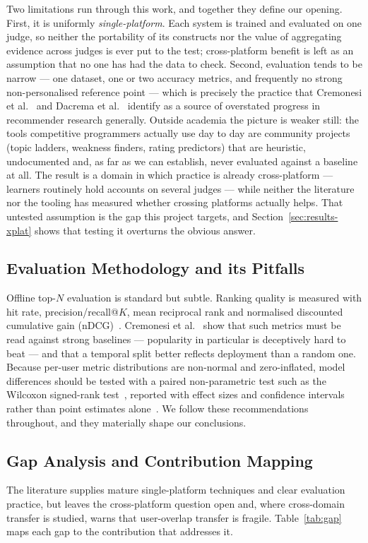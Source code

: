 \documentclass[12pt,a4paper]{article}
\newcommand{\ndcg}{nDCG}
\begin{document}
Two limitations run through this work, and together they define our opening. First, it
is uniformly \emph{single-platform}. Each system is trained and evaluated on one judge,
so neither the portability of its constructs nor the value of aggregating evidence
across judges is ever put to the test; cross-platform benefit is left as an assumption
that no one has had the data to check. Second, evaluation tends to be narrow --- one
dataset, one or two accuracy metrics, and frequently no strong non-personalised
reference point --- which is precisely the practice that Cremonesi et
al.~\cite{cremonesi2010} and Dacrema et al.~\cite{dacrema2019} identify as a source of
overstated progress in recommender research generally. Outside academia the picture is
weaker still: the tools competitive programmers actually use day to day are community
projects (topic ladders, weakness finders, rating predictors) that are heuristic,
undocumented and, as far as we can establish, never evaluated against a baseline at all.
The result is a domain in which practice is already cross-platform --- learners routinely
hold accounts on several judges --- while neither the literature nor the tooling has
measured whether crossing platforms actually helps. That untested assumption is the gap
this project targets, and Section~\ref{sec:results-xplat} shows that testing it
overturns the obvious answer.

\subsection{Evaluation Methodology and its Pitfalls}
Offline top-$N$ evaluation is standard but subtle. Ranking quality is measured with hit
rate, precision/recall@$K$, mean reciprocal rank and normalised discounted cumulative
gain (\ndcg{})~\cite{jarvelin2002}. Cremonesi et al.~\cite{cremonesi2010} show that such
metrics must be read against strong baselines --- popularity in particular is
deceptively hard to beat --- and that a temporal split better reflects deployment than a
random one. Because per-user metric distributions are non-normal and zero-inflated,
model differences should be tested with a paired non-parametric test such as the
Wilcoxon signed-rank test~\cite{wilcoxon1945}, reported with effect sizes and confidence
intervals rather than point estimates alone~\cite{dacrema2019}. We follow these
recommendations throughout, and they materially shape our conclusions.

\subsection{Gap Analysis and Contribution Mapping}
The literature supplies mature single-platform techniques and clear evaluation practice,
but leaves the cross-platform question open and, where cross-domain transfer is studied,
warns that user-overlap transfer is fragile. Table~\ref{tab:gap} maps each gap to the
contribution that addresses it.
\end{document}
